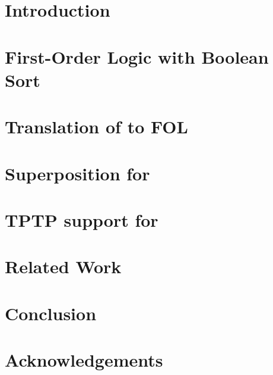 \section{Introduction}
\label{sec:cicm15/introduction}



\section[First-Order Logic with Boolean Sort]{First-Order Logic with Boolean Sort}
\label{sec:folbool}



\section{Translation of \folb{} to FOL}
\label{sec:folb-to-fol}



\section{Superposition for \folb{}}
\label{sec:superposition}



\section{TPTP support for \folb{}}
\label{sec:tptp}



\section{Related Work}
\label{sec:cicm15/related}



\section{Conclusion}
\label{sec:cicm15/conclusions}



\section*{Acknowledgements}
\label{sec:cicm15/acknowledgements}

